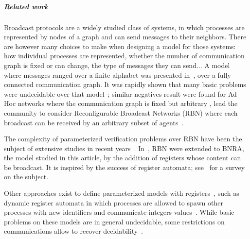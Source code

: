\subparagraph*{Related work} 
Broadcast protocols are a widely studied class of systems, in which processes are represented by nodes of a graph and can send messages to their neighbors. There are however many choices to make when designing a model for those systems: how individual processes are represented, whether the number of communication graph is fixed or can change, the type of messages they can send... 
A model where messages ranged over a finite alphabet was presented in~\cite{emerson1998model}, over a fully connected communication graph. It was rapidly shown that many basic problems were undecidable over that model~\cite{EsparzaFM1999verification}; similar negatives result were found for Ad Hoc networks where the communication graph is fixed but arbitrary \cite{DBLP:conf/concur/DelzannoSZ10}, lead the community to consider Reconfigurable Broadcast Networks (RBN) where each broadcast can be received by an arbitrary subset of agents~\cite{DelzannoSZ2010Adhoc}.

The complexity of parameterized verification problems over RBN have been the subject of extensive studies in recent years~\cite{DelzannoSTZ12, Balasubramanian18, BalasubramanianGW22, DBLP:journals/computing/ChiniMS22}. In~\cite{DelzannoST13}, RBN were extended to BNRA, the model studied in this article, by the addition of registers whose content can be broadcast. It is inspired by the success of register automata; see~\cite{Segoufin06} for a survey on the subject.

Other approaches exist to define parameterized models with registers~\cite{BolligRS21}, such as dynamic register automata in which processes are allowed to spawn other processes with new identifiers and communicate integers values~\cite{AbdullaAKR14}. While basic problems on these models are in general undecidable, some restrictions on communications allow to recover decidability~\cite{AbdullaAKR15, Rezine17}. 

